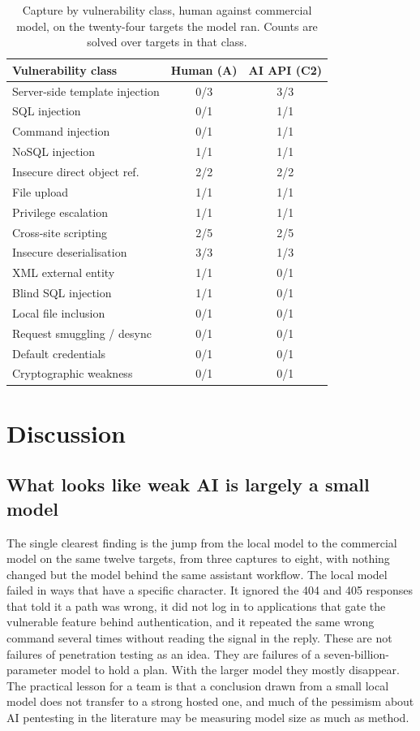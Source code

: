 \documentclass[11pt]{article}
\begin{document}
\begin{table}[htbp]
\centering
\caption{Capture by vulnerability class, human against commercial model, on the twenty-four targets the model ran. Counts are solved over targets in that class.}
\label{tab:class}
\small
\begin{tabular}{@{}lcc@{}}
\toprule
Vulnerability class & Human (A) & AI API (C2) \\
\midrule
Server-side template injection & 0/3 & 3/3 \\
SQL injection                  & 0/1 & 1/1 \\
Command injection              & 0/1 & 1/1 \\
NoSQL injection                & 1/1 & 1/1 \\
Insecure direct object ref.    & 2/2 & 2/2 \\
File upload                    & 1/1 & 1/1 \\
Privilege escalation           & 1/1 & 1/1 \\
Cross-site scripting           & 2/5 & 2/5 \\
Insecure deserialisation       & 3/3 & 1/3 \\
XML external entity            & 1/1 & 0/1 \\
Blind SQL injection            & 1/1 & 0/1 \\
Local file inclusion           & 0/1 & 0/1 \\
Request smuggling / desync     & 0/1 & 0/1 \\
Default credentials            & 0/1 & 0/1 \\
Cryptographic weakness         & 0/1 & 0/1 \\
\bottomrule
\end{tabular}
\end{table}

\section{Discussion}

\subsection{What looks like weak AI is largely a small model}
The single clearest finding is the jump from the local model to the commercial model on the same twelve targets, from three captures to eight, with nothing changed but the model behind the same assistant workflow. The local model failed in ways that have a specific character. It ignored the 404 and 405 responses that told it a path was wrong, it did not log in to applications that gate the vulnerable feature behind authentication, and it repeated the same wrong command several times without reading the signal in the reply. These are not failures of penetration testing as an idea. They are failures of a seven-billion-parameter model to hold a plan. With the larger model they mostly disappear. The practical lesson for a team is that a conclusion drawn from a small local model does not transfer to a strong hosted one, and much of the pessimism about AI pentesting in the literature may be measuring model size as much as method.
\end{document}
